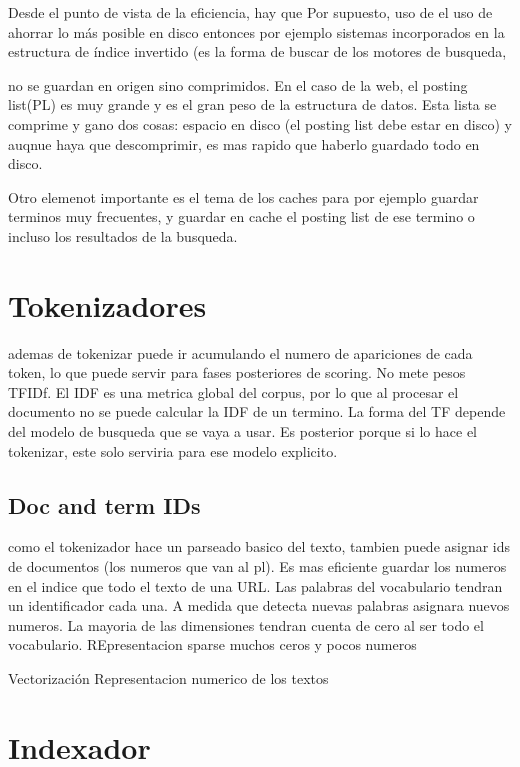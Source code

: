 Desde el punto de vista de la eficiencia, hay que Por supuesto, uso de el uso de ahorrar lo más posible en disco entonces por ejemplo sistemas incorporados en la estructura de índice invertido (es la forma de buscar de los motores de busqueda, 


no se guardan en origen sino comprimidos. En el caso de la web, el posting list(PL) es muy grande y es el gran peso de la estructura de datos. Esta lista se comprime y gano dos cosas: espacio en disco (el posting list debe estar en disco) y auqnue haya que descomprimir, es mas rapido que haberlo guardado todo en disco.

Otro elemenot importante es el tema de los caches para por ejemplo guardar terminos muy frecuentes, y guardar en cache el posting list de ese termino o incluso los resultados de la busqueda. 

\section{Tokenizadores}

ademas de tokenizar puede ir acumulando el numero de apariciones de cada token, lo que puede servir para fases posteriores de scoring. No mete pesos TFIDf. El IDF es una metrica global del corpus, por lo que al procesar el documento no se puede calcular la IDF de un termino. La forma del TF depende del modelo de busqueda que se vaya a usar. Es posterior porque si lo hace el tokenizar, este solo serviria para ese modelo explicito. 


\subsection{Doc and term IDs}

como el tokenizador hace un parseado basico del texto, tambien puede asignar ids de documentos (los numeros que van al pl). Es mas eficiente guardar los numeros en el indice que todo el texto de una URL. Las palabras del vocabulario tendran un identificador cada una. A medida que detecta nuevas palabras asignara nuevos numeros. La mayoria de las dimensiones tendran cuenta de cero al ser todo el vocabulario. REpresentacion sparse muchos ceros y pocos numeros


Vectorización Representacion numerico de los textos 


\section{Indexador}


